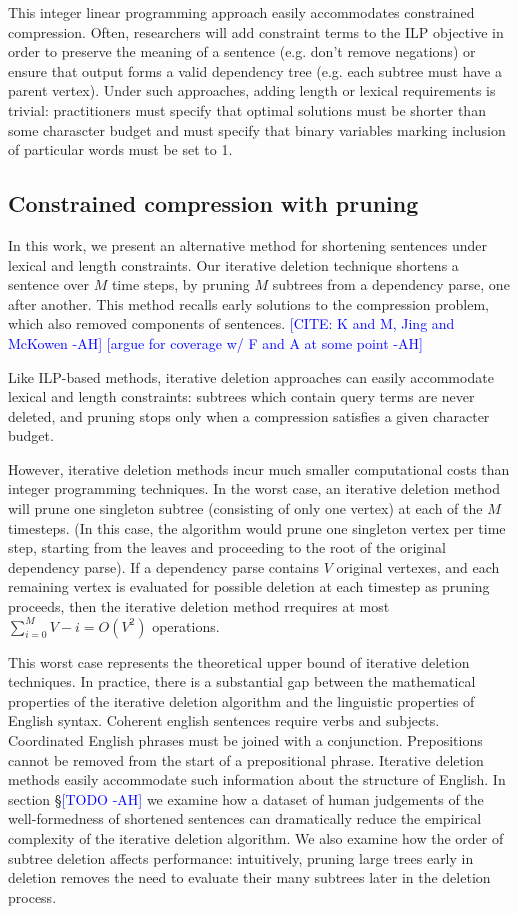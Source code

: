 \documentclass[11pt,a4paper]{article}
\newcommand{\ahcomment}[1]{\textcolor{blue}{[#1 -AH]}}
\begin{document}
This integer linear programming approach easily accommodates constrained compression. Often, researchers will add constraint terms to the ILP objective in order to preserve the meaning of a sentence (e.g. don't remove negations) or ensure that output forms a valid dependency tree (e.g. each subtree must have a parent vertex). Under such approaches, adding length or lexical requirements is trivial: practitioners must specify that optimal solutions must be shorter than some charascter budget and must specify that binary variables marking inclusion of particular words must be set to 1. 

\subsection{Constrained compression with pruning}

In this work, we present an alternative method for shortening sentences under lexical and length constraints. Our iterative deletion technique shortens a sentence over $M$ time steps, by pruning $M$ subtrees from a dependency parse, one after another. This method recalls early solutions to the compression problem, which also removed components of sentences. \ahcomment{CITE: K and M, Jing  and McKowen} \ahcomment{argue for coverage w/ F and A at some point}

Like ILP-based methods, iterative deletion approaches can easily accommodate lexical and length constraints: subtrees which contain query terms are never deleted, and pruning stops only when a compression satisfies a given character budget. 

However, iterative deletion methods incur much smaller computational costs than integer programming techniques. In the worst case, an iterative deletion method will prune one singleton subtree (consisting of only one vertex) at each of the $M$ timesteps. (In this case, the algorithm would prune one singleton vertex per time step, starting from the leaves and proceeding to the root of the original dependency parse). If a dependency parse contains $V$ original vertexes, and each remaining vertex is evaluated for possible deletion at each timestep as pruning proceeds, then the iterative deletion method rrequires at most $\sum_{i = 0}^M V - i = O(V^2)$ operations.

This worst case represents the theoretical upper bound of iterative deletion techniques. In practice, there is a substantial gap between the mathematical properties of the iterative deletion algorithm and the linguistic properties of English syntax. Coherent english sentences require verbs and subjects. Coordinated English phrases must be joined with a conjunction. Prepositions cannot be removed from the start of a prepositional phrase. Iterative deletion methods easily accommodate such information about the structure of English. In section \S\ahcomment{TODO} we examine how a dataset of human judgements of the well-formedness of shortened sentences can dramatically reduce the empirical complexity of the iterative deletion algorithm. We also examine how the order of subtree deletion affects performance: intuitively, pruning large trees early in deletion removes the need to evaluate their many subtrees later in the deletion process.
\end{document}
